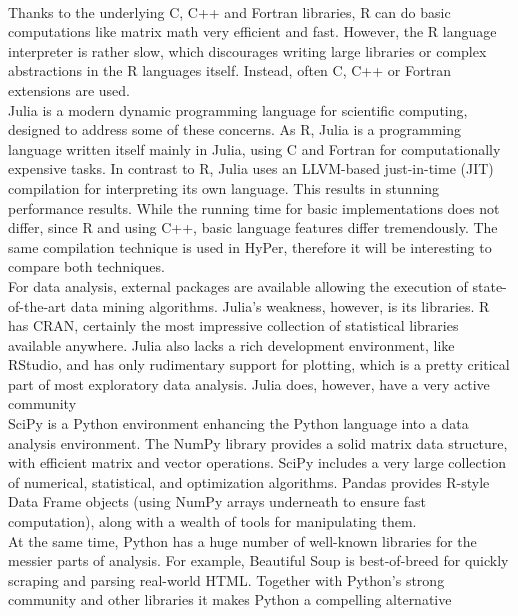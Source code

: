 \\
Thanks to the underlying C, C++ and Fortran libraries, R can do basic computations like matrix math very efficient and fast. However, the R language interpreter is rather slow, which discourages writing large libraries or complex abstractions in the R languages itself. Instead, often C, C++ or Fortran extensions are used.
\\
Julia is a modern dynamic programming language for scientific computing, designed to address some of these concerns. As R, Julia is a programming language written itself mainly in Julia, using C and Fortran for computationally expensive tasks. In contrast to R, Julia uses an LLVM-based just-in-time (JIT) compilation for interpreting its own language. This results in stunning performance results. While the running time for basic implementations does not differ, since R and using C++, basic language features differ tremendously.  The same compilation technique is used in HyPer, therefore it will be interesting to compare both techniques.
\\
For data analysis, external packages are available allowing the execution of state-of-the-art data mining algorithms. Julia’s weakness, however, is its libraries. R has CRAN, certainly the most impressive collection of statistical libraries available anywhere. Julia also lacks a rich development environment, like RStudio, and has only rudimentary support for plotting, which is a pretty critical part of most exploratory data analysis. Julia does, however, have a very active community
\\
SciPy is a Python environment enhancing the Python language into a data analysis environment. The NumPy library provides a solid matrix data structure, with efficient matrix and vector operations. 
SciPy includes a very large collection of numerical, statistical, and optimization algorithms.
Pandas provides R-style Data Frame objects (using NumPy arrays underneath to ensure fast computation), along with a wealth of tools for manipulating them.
\\
At the same time, Python has a huge number of well-known libraries for the messier parts of analysis. For example, Beautiful Soup is best-of-breed for quickly scraping and parsing real-world HTML. Together with Python’s strong community and other libraries it makes Python a compelling alternative



